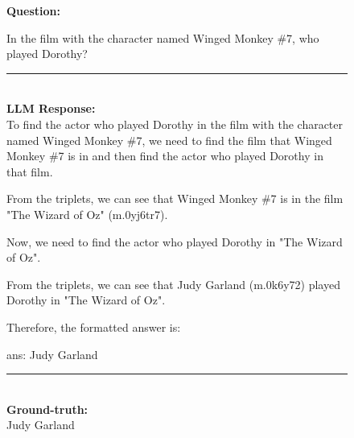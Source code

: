 \begin{figure}
\begin{tcolorbox}[colback=gray!5!white, colframe=gray!75!black, title=CWQ-WebQTrn-557\_960c16ffdb29e173df0577fc76c7455d]
\scriptsize

\textbf{Question:}\\
\raggedright In the film with the character named Winged Monkey \#7, who played Dorothy?

\rule{\linewidth}{0.4pt}
\\
\textbf{LLM Response:}\\
To find the actor who played Dorothy in the film with the character named Winged Monkey \#7, we need to find the film that Winged Monkey \#7 is in and then find the actor who played Dorothy in that film.



From the triplets, we can see that Winged Monkey \#7 is in the film "The Wizard of Oz" (m.0yj6tr7).



Now, we need to find the actor who played Dorothy in "The Wizard of Oz".



From the triplets, we can see that Judy Garland (m.0k6y72) played Dorothy in "The Wizard of Oz".



Therefore, the formatted answer is:



ans: Judy Garland

\rule{\linewidth}{0.4pt}
\\
\textbf{Ground-truth:}\\
Judy Garland

\end{tcolorbox}
 

\end{figure}



